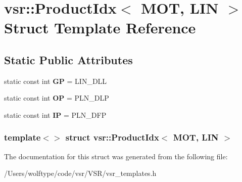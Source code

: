 \hypertarget{structvsr_1_1_product_idx_3_01_m_o_t_00_01_l_i_n_01_4}{\section{vsr\-:\-:Product\-Idx$<$ M\-O\-T, L\-I\-N $>$ Struct Template Reference}
\label{structvsr_1_1_product_idx_3_01_m_o_t_00_01_l_i_n_01_4}
}
\subsection*{Static Public Attributes}
\begin{DoxyCompactItemize}
\item 
\hypertarget{structvsr_1_1_product_idx_3_01_m_o_t_00_01_l_i_n_01_4_a9d9bc36d791ba944ddd7bba18d7db25e}{static const int {\bfseries G\-P} = L\-I\-N\-\_\-\-D\-L\-L}\label{structvsr_1_1_product_idx_3_01_m_o_t_00_01_l_i_n_01_4_a9d9bc36d791ba944ddd7bba18d7db25e}

\item 
\hypertarget{structvsr_1_1_product_idx_3_01_m_o_t_00_01_l_i_n_01_4_ada2d3dd0ee8190f7d732a94bc6208eea}{static const int {\bfseries O\-P} = P\-L\-N\-\_\-\-D\-L\-P}\label{structvsr_1_1_product_idx_3_01_m_o_t_00_01_l_i_n_01_4_ada2d3dd0ee8190f7d732a94bc6208eea}

\item 
\hypertarget{structvsr_1_1_product_idx_3_01_m_o_t_00_01_l_i_n_01_4_a5411d7cbc2e4b1140e4eb0ddbb4f5071}{static const int {\bfseries I\-P} = P\-L\-N\-\_\-\-D\-F\-P}\label{structvsr_1_1_product_idx_3_01_m_o_t_00_01_l_i_n_01_4_a5411d7cbc2e4b1140e4eb0ddbb4f5071}

\end{DoxyCompactItemize}
\subsubsection*{template$<$$>$ struct vsr\-::\-Product\-Idx$<$ M\-O\-T, L\-I\-N $>$}



The documentation for this struct was generated from the following file\-:\begin{DoxyCompactItemize}
\item 
/\-Users/wolftype/code/vsr/\-V\-S\-R/vsr\-\_\-templates.\-h\end{DoxyCompactItemize}

